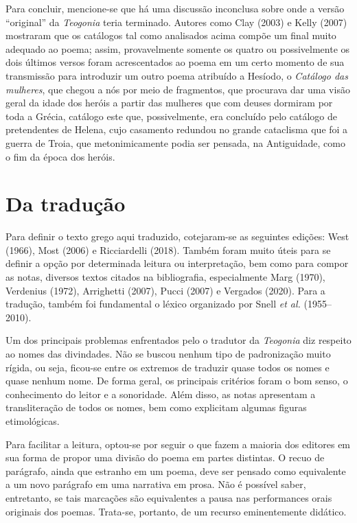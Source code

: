 Para concluir, mencione-se que há uma discussão inconclusa sobre onde a
versão ``original'' da \textit{Teogonia} teria terminado. Autores como
Clay (2003) e Kelly (2007) mostraram que os catálogos tal como
analisados acima compõe um final muito adequado ao poema; assim,
provavelmente somente os quatro ou possivelmente os dois últimos versos
foram acrescentados ao poema em um certo momento de sua transmissão para
introduzir um outro poema atribuído a Hesíodo, o \textit{Catálogo das
mulheres}, que chegou a nós por meio de fragmentos, que procurava
dar uma visão geral da idade dos heróis a partir das mulheres que com
deuses dormiram por toda a Grécia, catálogo este que, possivelmente, era
concluído pelo catálogo de pretendentes de Helena, cujo casamento
redundou no grande cataclisma que foi a guerra de Troia, que
metonimicamente podia ser pensada, na Antiguidade, como o fim da época
dos heróis.

\section{Da tradução}

Para definir o texto grego aqui traduzido, cotejaram-se as seguintes
edições: West (1966), Most (2006) e Ricciardelli (2018). Também foram
muito úteis para se definir a opção por determinada leitura ou
interpretação, bem como para compor as notas, diversos textos citados na
bibliografia, especialmente Marg (1970), Verdenius (1972), Arrighetti
(2007), Pucci (2007) e Vergados (2020). Para a tradução, também foi
fundamental o léxico organizado por Snell \textit{et al.} (1955--2010).

Um dos principais problemas enfrentados pelo o tradutor da
\textit{Teogonia} diz respeito ao nomes das divindades. Não se buscou
nenhum tipo de padronização muito rígida, ou seja, ficou-se entre os
extremos de traduzir quase todos os nomes e quase nenhum nome. De
forma geral, os principais critérios foram o bom senso, o conhecimento
do leitor e a sonoridade. Além disso, as notas apresentam a
transliteração de todos os nomes, bem como explicitam algumas figuras
etimológicas.

Para facilitar a leitura, optou-se por seguir o que fazem a maioria dos
editores em sua forma de propor uma divisão do poema em partes
distintas. O recuo de parágrafo, ainda que estranho em um poema, deve
ser pensado como equivalente a um novo parágrafo em uma narrativa em
prosa. Não é possível saber, entretanto, se tais marcações são
equivalentes a pausa nas performances orais originais dos poemas.
Trata-se, portanto, de um recurso eminentemente didático.

